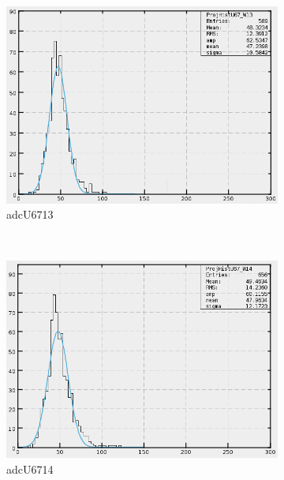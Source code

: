 \begin{figure}[h]
\begin{subfigure}[h]{0.3\textwidth}
        \includegraphics[width=\textwidth, keepaspectratio = true]{adcU67_13}
        \caption{adcU6713}
        \label{fig:adcU67_13}
    \end{subfigure}
    \\
    \begin{subfigure}[h]{0.3\textwidth}
        \centering
        \includegraphics[width=\textwidth, keepaspectratio = true]{adcU67_14}
        \caption{adcU6714}
        \label{fig:adcU67_14}
    \end{subfigure}
    ~
    \begin{subfigure}[h]{0.3\textwidth}
        \centering

\end{subfigure}
\end{figure}

